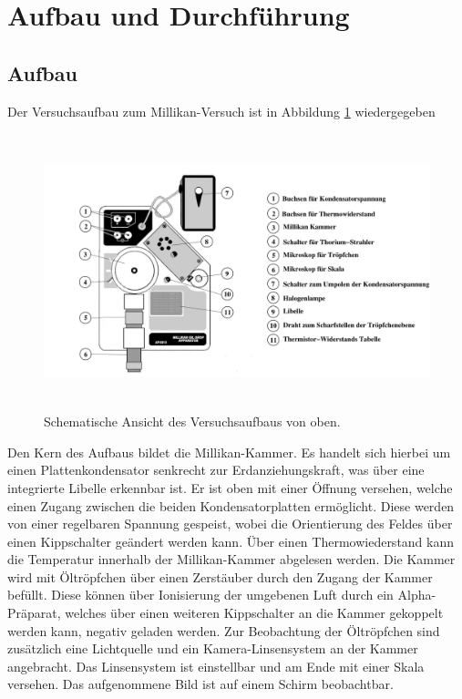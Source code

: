 \section{Aufbau und Durchführung}
\subsection{Aufbau}
\label{sec:Aufbau}

Der Versuchsaufbau zum Millikan-Versuch ist in Abbildung \ref{millikan} wiedergegeben

\begin{figure}
  \centering
  \includegraphics[height=8cm]{ressources/aufbau.png}
  \caption{Schematische Ansicht des Versuchsaufbaus von oben. \cite{skript}}
  \label{millikan}
\end{figure}


Den Kern des Aufbaus bildet die Millikan-Kammer.
Es handelt sich hierbei um einen Plattenkondensator senkrecht zur Erdanziehungskraft, was über eine integrierte Libelle erkennbar ist.
Er ist oben mit einer Öffnung versehen, welche einen Zugang zwischen die beiden Kondensatorplatten ermöglicht.
Diese werden von einer regelbaren Spannung gespeist, wobei die Orientierung des Feldes über einen Kippschalter geändert werden kann.
Über einen Thermowiederstand kann die Temperatur innerhalb der Millikan-Kammer abgelesen werden.
Die Kammer wird mit Öltröpfchen über einen Zerstäuber durch den Zugang der Kammer befüllt.
Diese können über Ionisierung der umgebenen Luft durch ein Alpha-Präparat, welches über einen weiteren Kippschalter an die Kammer gekoppelt werden kann, negativ geladen werden.
Zur Beobachtung der Öltröpfchen sind zusätzlich eine Lichtquelle und ein Kamera-Linsensystem an der Kammer angebracht.
Das Linsensystem ist einstellbar und am Ende mit einer Skala versehen.
Das aufgenommene Bild ist auf einem Schirm beobachtbar.
